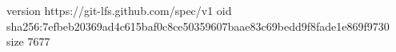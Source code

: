 version https://git-lfs.github.com/spec/v1
oid sha256:7efbeb20369ad4c615baf0c8ce50359607baae83c69bedd9f8fade1e869f9730
size 7677
